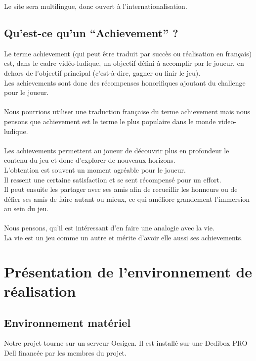 \documentclass{life-fr}
\begin{document}
Le site sera multilingue, donc ouvert à l'internationalisation.

\section{Qu'est-ce qu'un ``Achievement'' ?}
Le terme achievement (qui peut être traduit par succès ou réalisation en français) est, dans le cadre vidéo-ludique,  un objectif défini à accomplir par le joueur, en dehors de l’objectif principal (c’est-à-dire, gagner ou finir le jeu).\\
 Les achievements sont donc des récompenses honorifiques ajoutant du challenge pour le joueur.\\
\\
Nous pourrions utiliser une traduction française du terme achievement mais nous pensons que achievement est le terme le plus populaire dans le monde video-ludique.\\
\\
Les achievements permettent au joueur de découvrir plus en profondeur le contenu du jeu et donc d’explorer de nouveaux horizons.\\
 L’obtention est souvent un moment agréable pour le joueur.\\
 Il ressent une certaine satisfaction et se sent récompensé pour un effort.\\
 Il peut ensuite les partager avec ses amis afin de recueillir les honneurs ou de défier ses amis de faire autant ou mieux, ce qui améliore grandement l’immersion au sein du jeu.\\
\\
Nous pensons, qu’il est intéressant d’en faire une analogie avec la vie.\\
 La vie est un jeu comme un autre et mérite d’avoir elle aussi ses achievements.\\



\chapter{Présentation de l’environnement de réalisation}

\section{Environnement matériel}

Notre projet tourne sur un serveur Ocsigen. Il est installé sur une Dedibox PRO Dell financée par les membres du projet.
\end{document}
